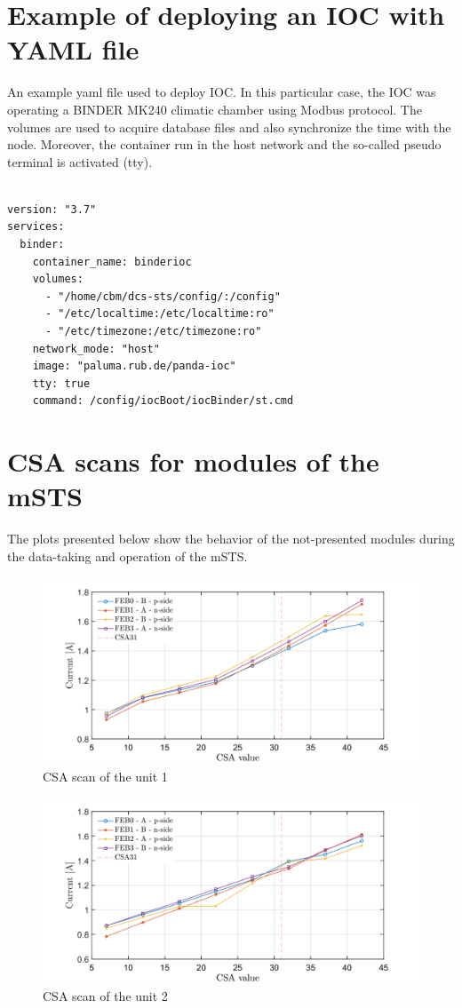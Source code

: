 \newpage
\appendix

\chapter{Example of deploying an IOC with YAML file}
An example yaml file used to deploy \gls{IOC}. In this particular case, the IOC was operating a BINDER MK240 climatic chamber using Modbus protocol. The volumes are used to acquire database files and also synchronize the time with the node. Moreover, the container run in the host network and the so-called pseudo terminal is activated (tty). 
\label{YAML}
\begin{verbatim}

version: "3.7"
services:
  binder:
    container_name: binderioc
    volumes:
      - "/home/cbm/dcs-sts/config/:/config"
      - "/etc/localtime:/etc/localtime:ro"
      - "/etc/timezone:/etc/timezone:ro"
    network_mode: "host"
    image: "paluma.rub.de/panda-ioc"
    tty: true
    command: /config/iocBoot/iocBinder/st.cmd
\end{verbatim}

\chapter{CSA scans for modules of the mSTS}
\label{CSA}
The plots presented below show the behavior of the not-presented modules during the data-taking and operation of the mSTS. 

\begin{figure}[h!]
\centering
\includegraphics[width=0.9\columnwidth]{Chapter6/DCS/images/U1CSABIAS.png}
\caption{CSA scan of the unit 1}
\label{U1CSABIAS}
\end{figure}

\begin{figure}[h!]
\centering
\includegraphics[width=0.9\columnwidth]{Chapter6/DCS/images/U2CSABIAS.png}
\caption{CSA scan of the unit 2}
\label{U2CSABIAS}
\end{figure}

